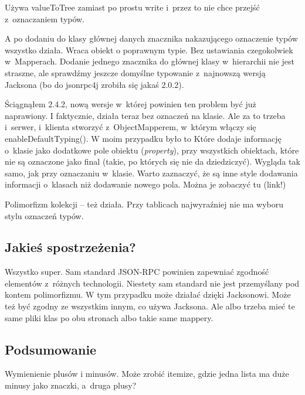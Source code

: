 Używa valueToTree zamiast po prostu write i~przez to nie chce przejść z~oznaczaniem typów.

A po dodaniu do klasy głównej danych znacznika nakazującego oznaczenie typów wszystko działa.
Wraca obiekt o poprawnym typie. Bez ustawiania czegokolwiek w~Mapperach.
Dodanie jednego znacznika do głównej klasy w~hierarchii nie jest straszne, ale sprawdźmy jeszcze domyślne typowanie z~najnowszą wersją Jacksona (bo do jsonrpc4j zrobiła się jakaś 2.0.2).

Ściągnąłem 2.4.2, nową wersje w~której powinien ten problem być już naprawiony. I faktycznie, działa teraz bez oznaczeń na klasie. Ale za to trzeba i~serwer, i~klienta stworzyć z~ObjectMapperem, w~którym włączy się enableDefaultTyping(). W moim przypadku było to
Które dodaje informację o~klasie jako dodatkowe pole obiektu (\emph{property}), przy wszystkich obiektach, które nie są oznaczone jako final (takie, po których się nie da dziedziczyć).
Wygląda tak samo, jak przy oznaczaniu w~klasie. Warto zaznaczyć, że są inne style dodawania informacji o~klasach niż dodawanie nowego pola. Można je zobaczyć tu (link!)

Polimorfizm kolekcji -- też działa. Przy tablicach najwyraźniej nie ma wyboru stylu oznaczeń typów.


\subsection{Jakieś spostrzeżenia?}
Wszystko super. Sam standard JSON-RPC powinien zapewniać zgodność elementów z~różnych technologii. Niestety sam standard nie jest przemyślany pod kontem polimorfizmu. W tym przypadku może działać dzięki Jacksonowi.
Może też być zgodny ze wszystkim innym, co używa Jacksona. Ale albo trzeba mieć te same pliki klas po obu stronach albo takie same mappery.

\subsection{Podsumowanie}
Wymienienie plusów i minusów. Może zrobić itemize, gdzie jedna lista ma duże minusy jako znaczki, a~druga plusy?




